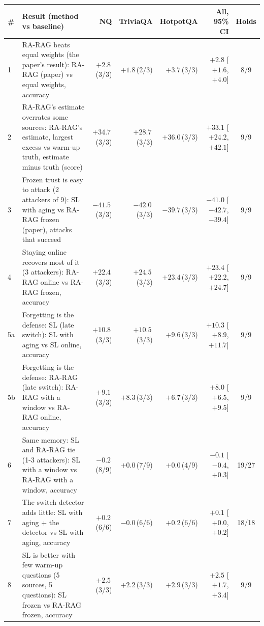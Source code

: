 \begin{landscape}
\begin{table}
\centering
\footnotesize\renewcommand{\arraystretch}{0.85}
\begin{tabular}{@{}l p{12.4cm} rrr r c@{}}
\toprule
\# & Result (method vs baseline) & NQ & TriviaQA & HotpotQA & All, 95\% CI & Holds \\
\midrule
1 & RA-RAG beats equal weights (the paper's result): RA-RAG (paper) vs equal weights, accuracy & $+2.8$\,{\scriptsize(3/3)} & $+1.8$\,{\scriptsize(2/3)} & $+3.7$\,{\scriptsize(3/3)} & $+2.8$ [$+1.6$, $+4.0$] & 8/9 \\
2 & RA-RAG's estimate overrates some sources: RA-RAG's estimate, largest excess vs warm-up truth, estimate minus truth (score) & $+34.7$\,{\scriptsize(3/3)} & $+28.7$\,{\scriptsize(3/3)} & $+36.0$\,{\scriptsize(3/3)} & $+33.1$ [$+24.2$, $+42.1$] & 9/9 \\
3 & Frozen trust is easy to attack (2 attackers of 9): SL with aging vs RA-RAG frozen (paper), attacks that succeed & $-41.5$\,{\scriptsize(3/3)} & $-42.0$\,{\scriptsize(3/3)} & $-39.7$\,{\scriptsize(3/3)} & $-41.0$ [$-42.7$, $-39.4$] & 9/9 \\
4 & Staying online recovers most of it (3 attackers): RA-RAG online vs RA-RAG frozen, accuracy & $+22.4$\,{\scriptsize(3/3)} & $+24.5$\,{\scriptsize(3/3)} & $+23.4$\,{\scriptsize(3/3)} & $+23.4$ [$+22.2$, $+24.7$] & 9/9 \\
5a & Forgetting is the defense: SL (late switch): SL with aging vs SL online, accuracy & $+10.8$\,{\scriptsize(3/3)} & $+10.5$\,{\scriptsize(3/3)} & $+9.6$\,{\scriptsize(3/3)} & $+10.3$ [$+8.9$, $+11.7$] & 9/9 \\
5b & Forgetting is the defense: RA-RAG (late switch): RA-RAG with a window vs RA-RAG online, accuracy & $+9.1$\,{\scriptsize(3/3)} & $+8.3$\,{\scriptsize(3/3)} & $+6.7$\,{\scriptsize(3/3)} & $+8.0$ [$+6.5$, $+9.5$] & 9/9 \\
6 & Same memory: SL and RA-RAG tie (1-3 attackers): SL with a window vs RA-RAG with a window, accuracy & $-0.2$\,{\scriptsize(8/9)} & $+0.0$\,{\scriptsize(7/9)} & $+0.0$\,{\scriptsize(4/9)} & $-0.1$ [$-0.4$, $+0.3$] & 19/27 \\
7 & The switch detector adds little: SL with aging + the detector vs SL with aging, accuracy & $+0.2$\,{\scriptsize(6/6)} & $-0.0$\,{\scriptsize(6/6)} & $+0.2$\,{\scriptsize(6/6)} & $+0.1$ [$+0.0$, $+0.2$] & 18/18 \\
8 & SL is better with few warm-up questions (5 sources, 5 questions): SL frozen vs RA-RAG frozen, accuracy & $+2.5$\,{\scriptsize(3/3)} & $+2.2$\,{\scriptsize(3/3)} & $+2.9$\,{\scriptsize(3/3)} & $+2.5$ [$+1.7$, $+3.4$] & 9/9 \\

\end{tabular}
\end{table}
\end{landscape}
